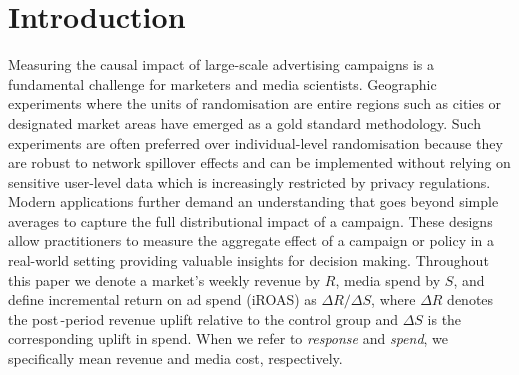 \documentclass[final,3p,fleqn, 10pt]{elsarticle}
\begin{document}



\section{Introduction}
\label{sec:introduction}
Measuring the causal impact of large-scale advertising campaigns is a fundamental challenge for marketers and media scientists. Geographic experiments where the units of randomisation are entire regions such as cities or designated market areas have emerged as a gold standard methodology. Such experiments are often preferred over individual-level randomisation because they are robust to network spillover effects and can be implemented without relying on sensitive user-level data which is increasingly restricted by privacy regulations. Modern applications further demand an understanding that goes beyond simple averages to capture the full distributional impact of a campaign. These designs allow practitioners to measure the aggregate effect of a campaign or policy in a real-world setting providing valuable insights for decision making. Throughout this paper we denote a market's weekly revenue by $R$, media spend by $S$, and define incremental return on ad spend (iROAS) as $\Delta R / \Delta S$, where $\Delta R$ denotes the post\,-period revenue uplift relative to the control group and $\Delta S$ is the corresponding uplift in spend. When we refer to \emph{response} and \emph{spend}, we specifically mean revenue and media cost, respectively.
\end{document}
